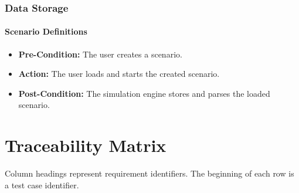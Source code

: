 \documentclass[titlepage]{article}
\newcommand{\testentry}[4]{
    \paragraph{#1}
    \begin{itemize}
        \item \textbf{Pre-Condition:} #2
        \item \textbf{Action:} #3
        \item \textbf{Post-Condition:} #4
    \end{itemize}
}
\begin{document}

\subsubsection{Data Storage%
  \label{data-storage}%
}
    \testentry{Scenario Definitions}{ 
        The user creates a scenario.
    }{
        The user loads and starts the created scenario.
    }{
        The simulation engine stores and parses the loaded scenario.
    }

\pagebreak
\section{Traceability Matrix%
  \label{Traceability Matrix}%
}

Column headings represent requirement identifiers. The beginning of each row is a test case identifier.
\vspace{5pt}
  
\end{document}
